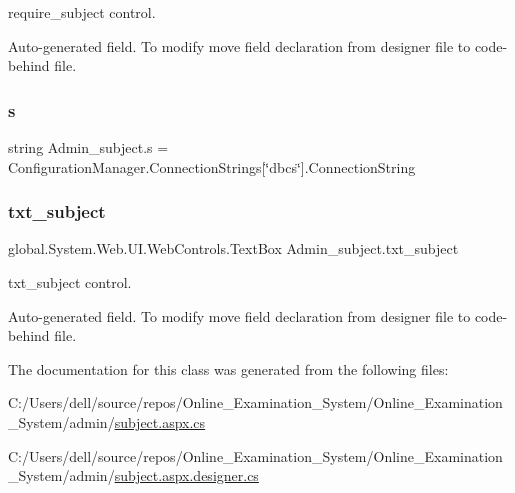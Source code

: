 require\+\_\+subject control. 

Auto-\/generated field. To modify move field declaration from designer file to code-\/behind file. \mbox{\label{class_admin__subject_ac0945297091deef9de3fd943432fc224}} 
\subsubsection{\texorpdfstring{s}{s}}
{\footnotesize\ttfamily string Admin\+\_\+subject.\+s = Configuration\+Manager.\+Connection\+Strings\mbox{[}\char`\"{}dbcs\char`\"{}\mbox{]}.Connection\+String\hspace{0.3cm}{\ttfamily [private]}}

\mbox{\label{class_admin__subject_a10fe3f208bc27fdc254caa37c13f5f2a}} 
\subsubsection{\texorpdfstring{txt\_subject}{txt\_subject}}
{\footnotesize\ttfamily global.\+System.\+Web.\+U\+I.\+Web\+Controls.\+Text\+Box Admin\+\_\+subject.\+txt\+\_\+subject\hspace{0.3cm}{\ttfamily [protected]}}



txt\+\_\+subject control. 

Auto-\/generated field. To modify move field declaration from designer file to code-\/behind file. 

The documentation for this class was generated from the following files\+:\begin{DoxyCompactItemize}
\item 
C\+:/\+Users/dell/source/repos/\+Online\+\_\+\+Examination\+\_\+\+System/\+Online\+\_\+\+Examination\+\_\+\+System/admin/\mbox{\hyperlink{subject_8aspx_8cs}{subject.\+aspx.\+cs}}\item 
C\+:/\+Users/dell/source/repos/\+Online\+\_\+\+Examination\+\_\+\+System/\+Online\+\_\+\+Examination\+\_\+\+System/admin/\mbox{\hyperlink{subject_8aspx_8designer_8cs}{subject.\+aspx.\+designer.\+cs}}\end{DoxyCompactItemize}
